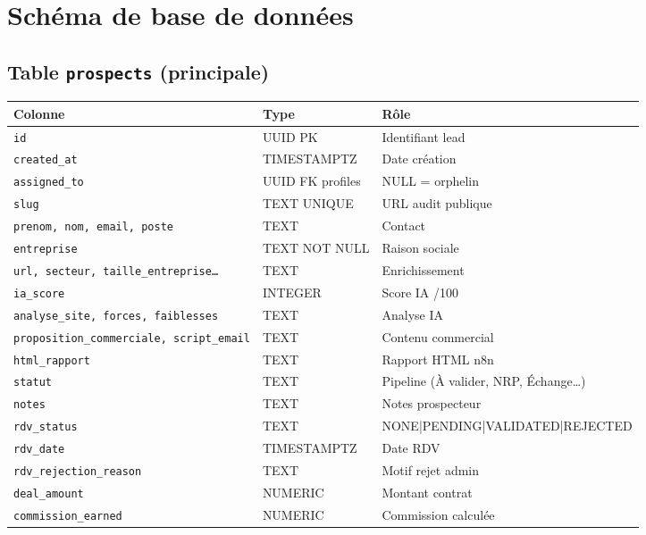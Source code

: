 \documentclass[11pt,a4paper]{report}
\begin{document}
\chapter{Schéma de base de données}

\section{Table \texttt{prospects} (principale)}

\begin{longtable}{@{}p{4cm}p{3cm}p{7cm}@{}}
\toprule
\textbf{Colonne} & \textbf{Type} & \textbf{Rôle} \\
\midrule
\endhead
\texttt{id} & UUID PK & Identifiant lead \\
\texttt{created\_at} & TIMESTAMPTZ & Date création \\
\texttt{assigned\_to} & UUID FK profiles & NULL = orphelin \\
\texttt{slug} & TEXT UNIQUE & URL audit publique \\
\texttt{prenom, nom, email, poste} & TEXT & Contact \\
\texttt{entreprise} & TEXT NOT NULL & Raison sociale \\
\texttt{url, secteur, taille\_entreprise\ldots} & TEXT & Enrichissement \\
\texttt{ia\_score} & INTEGER & Score IA /100 \\
\texttt{analyse\_site, forces, faiblesses} & TEXT & Analyse IA \\
\texttt{proposition\_commerciale, script\_email} & TEXT & Contenu commercial \\
\texttt{html\_rapport} & TEXT & Rapport HTML n8n \\
\texttt{statut} & TEXT & Pipeline (À valider, NRP, Échange\ldots) \\
\texttt{notes} & TEXT & Notes prospecteur \\
\texttt{rdv\_status} & TEXT & NONE|PENDING|VALIDATED|REJECTED \\
\texttt{rdv\_date} & TIMESTAMPTZ & Date RDV \\
\texttt{rdv\_rejection\_reason} & TEXT & Motif rejet admin \\
\texttt{deal\_amount} & NUMERIC & Montant contrat \\
\texttt{commission\_earned} & NUMERIC & Commission calculée \\
\bottomrule
\end{longtable}
\end{document}
